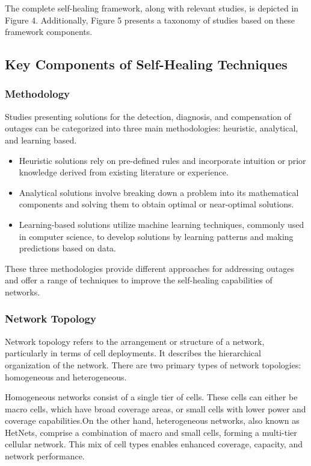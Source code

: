 The complete self-healing framework, along with relevant studies, is depicted in Figure 4. Additionally, Figure 5 presents a taxonomy of studies based on these framework components.

\subsection{Key Components of Self-Healing Techniques\\}

\subsubsection{Methodology}

Studies presenting solutions for the detection, diagnosis, and compensation of outages can be categorized into three main methodologies: heuristic, analytical, and learning based.


\begin{itemize}
\item  Heuristic solutions rely on pre-defined rules and incorporate intuition or prior knowledge derived from existing literature or experience.

\item  Analytical solutions involve breaking down a problem into its mathematical components and solving them to obtain optimal or near-optimal solutions.

\item Learning-based solutions utilize machine learning techniques, commonly used in computer science, to develop solutions by learning patterns and making predictions based on data.


\end{itemize}


These three methodologies provide different approaches for addressing outages and offer a range of techniques to improve the self-healing capabilities of networks.


\subsubsection{Network Topology}

Network topology refers to the arrangement or structure of a network, particularly in terms of cell deployments. It describes the hierarchical organization of the network. There are two primary types of network topologies: homogeneous and heterogeneous.

Homogeneous networks consist of a single tier of cells. These cells can either be macro cells, which have broad coverage areas, or small cells with lower power and coverage capabilities.On the other hand, heterogeneous networks, also known as HetNets, comprise a combination of macro and small cells, forming a multi-tier cellular network. This mix of cell types enables enhanced coverage, capacity, and network performance.


